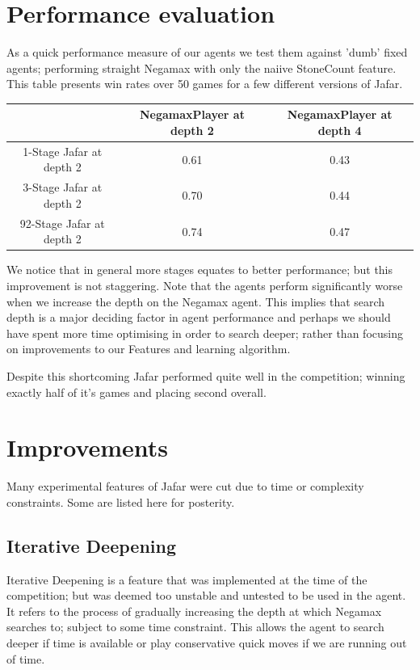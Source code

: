 \documentclass[11pt]{article}
\begin{document}
\section{Performance evaluation}
\label{sec:performance}
As a quick performance measure of our agents we test them against 'dumb' fixed
agents; performing straight Negamax with only the naiive StoneCount feature.
This table presents win rates over 50 games for a few different versions of Jafar.
\begin{center}
\begin{tabular}{c c c}
  \toprule
      & NegamaxPlayer at depth 2  & NegamaxPlayer at depth 4  \\
    \midrule
1-Stage Jafar at depth 2  & 0.61 & 0.43 \\ 
3-Stage Jafar at depth 2    & 0.70 & 0.44\\ 
92-Stage Jafar at depth 2   & 0.74 & 0.47\\
\bottomrule
\end{tabular}
\end{center}
We notice that in general more stages equates to better performance; but this improvement
is not staggering. Note that the agents perform significantly worse when we increase the depth on the 
Negamax agent. This implies that search depth is a major deciding factor in agent 
performance and perhaps we should have spent more time optimising in order to search deeper;
rather than focusing on improvements to our Features and learning algorithm.

Despite this shortcoming Jafar performed quite well in the competition; winning exactly
half of it's games and placing second overall.

\section{Improvements}
\label{sec:improvements}
Many experimental features of Jafar were cut due to time or complexity constraints.
Some are listed here for posterity.

\subsection{Iterative Deepening}
\label{sub:i_deepening}

Iterative Deepening is a feature that was implemented at the time of the competition;
but was deemed too unstable and untested to be used in the agent.
It refers to the process of gradually increasing the depth at which Negamax searches to;
subject to some time constraint. This allows the agent to search deeper if
time is available or play conservative quick moves if we are running out of time.
\end{document}
